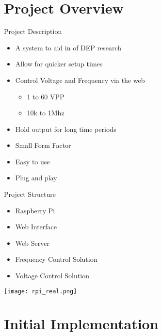 \section{Project Overview}

\begin{frame}{Project Description}
\begin{block}{}
  \begin{itemize}
    \item A system to aid in of DEP research
    \item Allow for quicker setup times
    \item Control Voltage and Frequency via the web
      \begin{itemize}
        \item 1 to 60 VPP
        \item 10k to 1Mhz
      \end{itemize}
    \item Hold output for long time periods
    \item Small Form Factor
    \item Easy to use
    \item Plug and play
  \end{itemize}
\end{block}
\end{frame}

\begin{frame}{Project Structure}
  \begin{multicols}{2}
  \begin{itemize}
    \item Raspberry Pi
    \item Web Interface
    \item Web Server
    \item Frequency Control Solution
    \item Voltage Control Solution
  \end{itemize}

  \newpage

  \texttt{[image: rpi\_real.png]}

  \end{multicols}
\end{frame}

\section{Initial Implementation}

